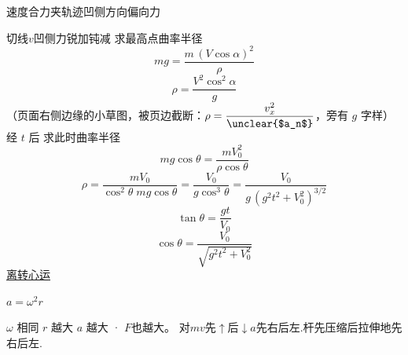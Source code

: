 速度合力夹轨迹\quad 凹侧方向偏向力

切线$v$\quad 凹侧力\quad 锐加钝减
求最高点曲率半径
\[ mg=\frac{m\,(V\cos\alpha)^{2}}{\rho} \]
\[ \rho=\frac{V^{2}\cos^{2}\alpha}{g} \] %
（页面右侧边缘的小草图，被页边截断：$\rho=\dfrac{v_x^{2}}{\text{\unclear{$a_n$}}}$，旁有 $g$ 字样）
经 $t$ 后 求此时曲率半径
\[ mg\cos\theta=\frac{mV_0^{2}}{\rho\cos\theta} \] %
\[ \rho=\frac{mV_0}{\cos^{2}\theta\; mg\cos\theta}=\frac{V_0}{g\cos^{3}\theta}=\frac{V_0}{g\,(g^{2}t^{2}+V_0^{2})^{3/2}} \] %
\[ \tan\theta=\frac{gt}{V_0} \]
\[ \cos\theta=\frac{V_0}{\sqrt{g^{2}t^{2}+V_0^{2}}} \]
\underline{离转心运}%

$a=\omega^2 r$

$\omega$ 相同 $r$ 越大 $a$ 越大 · $F$也越大。%
对$m$\quad $v$先$\uparrow$后$\downarrow$\quad $a$先右后左.\quad 杆先压缩后拉伸\quad 地先右后左.

